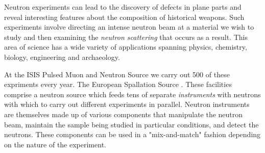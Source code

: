 Neutron experiments can lead to the discovery of defects in plane parts and reveal interesting features about the composition of historical weapons. Such experiments involve directing an intense neutron beam at a material we wish to study and then examining the \textit{neutron scattering} that occurs as a result. This area of science has a wide variety of applications spanning physics, chemistry, biology, engineering and archaeology.

At the ISIS Pulsed Muon and Neutron Source we carry out 500 of these expriments every year. The European Spallation Source . These facilities comprise a neutron source which feeds tens of separate \textit{instruments} with neutrons with which to carry out different experiments in parallel. Neutron instruments are themselves made up of various components that manipulate the neutron beam, maintain the sample being studied in particular conditions, and detect the neutrons. These components can be used in a "mix-and-match" fashion depending on the nature of the experiment.

\iffalse
In order to analyse the results of neutron experiments reliably we need a record of the \textit{experiment configuration}. This means an accurate description of the detected neutrons and conditions of the sample, but also the precise geometry of the components in the neutron instrument which was used. This information is stored in NeXus files. The \textit{NeXus Constructor} is an application under development to allow scientists to define the instrument geometry and precisely what data should be recorded during an experiment.
\fi

